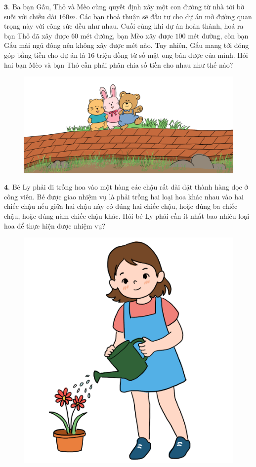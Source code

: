 \begin{multicols}{2}
\begin{figure}[H]
		\vspace*{-15pt}
	\end{figure}
	$\pmb{3.}$ Ba bạn Gấu, Thỏ và Mèo cùng quyết định xây một con đường từ nhà tới bờ suối với chiều dài $160m$. Các bạn thoả thuận sẽ đầu tư cho dự án mở đường quan trọng này với công sức đều như nhau. Cuối cùng khi dự án hoàn thành, hoá ra bạn Thỏ đã xây được $60$ mét đường, bạn Mèo xây được $100$ mét đường, còn bạn Gấu mải ngủ đông nên không xây được mét nào. Tuy nhiên, Gấu mang tới đóng góp bằng tiền cho dự án là $16$ triệu đồng từ số mật ong bán được của mình. Hỏi hai bạn Mèo và bạn Thỏ cần phải phân chia số tiền cho nhau như thế nào?
	\begin{figure}[H]
		\centering
		\vspace*{-5pt}
		\captionsetup{labelformat= empty, justification=centering}
		\includegraphics[width=1\linewidth]{Pi7_bai3}
		\vspace*{-15pt}
	\end{figure}
	$\pmb{4.}$ Bé Ly phải đi trồng hoa vào một hàng các chậu rất dài đặt thành hàng dọc ở công viên. Bé được giao nhiệm vụ là phải trồng hai loại hoa khác nhau vào hai chiếc chậu nếu giữa hai chậu này có đúng hai chiếc chậu, hoặc đúng ba chiếc chậu, hoặc đúng năm chiếc chậu khác. Hỏi bé Ly phải cần ít nhất bao nhiêu loại hoa để thực hiện được nhiệm vụ?
	\begin{figure}[H]
		\centering
		\vspace*{-5pt}
		\captionsetup{labelformat= empty, justification=centering}
		\includegraphics[width=0.5\linewidth]{Pi7_bai4}

\end{figure}
\end{multicols}
